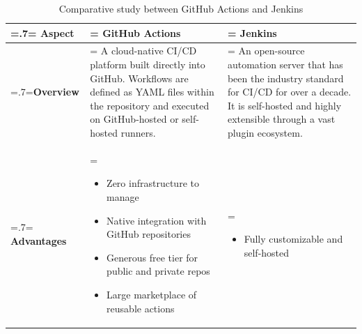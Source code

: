 \begin{table}[H]
    \renewcommand{\arraystretch}{1.5}%
    \caption{Comparative study between GitHub Actions and Jenkins}
    \centering
    \medskip
    \begin{tabularx}{1\textwidth} {
            | >{\hsize=.7\hsize\linewidth=\hsize\centering\arraybackslash}X
            | >{\hsize=1.15\hsize\linewidth=\hsize\justifying\arraybackslash}X
            | >{\hsize=1.15\hsize\linewidth=\hsize\justifying\arraybackslash}X |}
        \hline
        \rowcolor{primary} \textbf {Aspect} & \textbf{GitHub Actions}                                                                                                                                                                                                                     & \textbf{Jenkins}                                                                                                                                                                                                                                           \\
        \hline
        \textbf {Overview}                  & \noindent A cloud-native CI/CD platform built directly into GitHub. Workflows are defined as YAML files within the repository and executed on GitHub-hosted or self-hosted runners.                                                                                                             & \noindent An open-source automation server that has been the industry standard for CI/CD for over a decade. It is self-hosted and highly extensible through a vast plugin ecosystem.                                                                                                                                                                                   \\
        \hline
        \textbf {Advantages}                & \begin{itemize}[leftmargin=*, topsep=0pt, itemsep=1pt, parsep=2pt]
            \item Zero infrastructure to manage
            \item Native integration with GitHub repositories
            \item Generous free tier for public and private repos
            \item Large marketplace of reusable actions
        \end{itemize} & \begin{itemize}[leftmargin=*, topsep=0pt, itemsep=1pt, parsep=2pt]
            \item Fully customizable and self-hosted

\end{itemize}
\end{tabularx}
\end{table}
